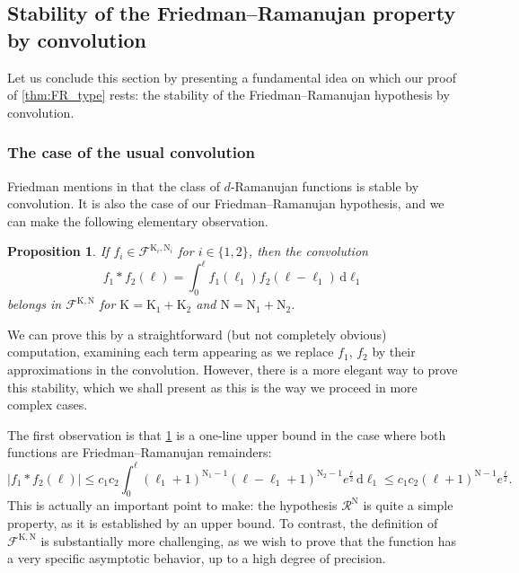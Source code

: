 \documentclass[12pt,twoside]{article}
\theoremstyle{theorem}
\newtheorem{prp}[thm]{Proposition}
\theoremstyle{remark}
\theoremstyle{definition}
\theoremstyle{example}
\renewcommand{\d}{\, \mathrm{d}}
\newcommand{\1}[1]{\mathds{1}_{#1}}
\newcommand{\cR}{\mathcal{R}}
\newcommand{\cF}{\mathcal{F}}
\newcommand{\rK}{\mathrm{K}}
\newcommand{\rN}{\mathrm{N}}
\begin{document}
\subsection{Stability of the Friedman--Ramanujan property by convolution}
\label{sec:stab-friedm-raman}


Let us conclude this section by presenting a fundamental idea on which our proof of
\cref{thm:FR_type} rests: the stability of the Friedman--Ramanujan hypothesis by convolution.


\subsubsection{The case of the usual convolution}
\label{sec:case-usual-conv}

Friedman mentions in \cite{friedman2003} that the class of $d$-Ramanujan functions is stable by
convolution. It is also the case of our Friedman--Ramanujan hypothesis, and we can make the
following elementary observation.

\begin{prp}
  \label{prp:stab_conv}
  If $f_i \in \cF^{\rK_i,\rN_i}$ for $i \in \{1,2\}$, then the convolution
  \begin{equation*}
    f_1 * f_2(\ell) = \int_0^\ell f_1(\ell_1) f_2(\ell-\ell_1) \d \ell_1
  \end{equation*}
  belongs in $\cF^{\rK,\rN}$ for $\rK=\rK_1+\rK_2$ and $\rN=\rN_1+\rN_2$.
\end{prp}

We can prove this by a straightforward (but not completely obvious) computation, examining each term
appearing as we replace $f_1$, $f_2$ by their approximations in the convolution. However, there is a
more elegant way to prove this stability, which we shall present as this is the way we proceed in
more complex cases.

The first observation is that \cref{prp:stab_conv} is a one-line upper bound in the case where both
functions are Friedman--Ramanujan remainders:
\begin{equation*}
  |f_1 * f_2(\ell)|
  \leq c_1 c_2  \int_0^\ell (\ell_1+1)^{\rN_1-1} (\ell-\ell_1+1)^{\rN_2-1} e^{\frac {\ell} 2} \d \ell_1
  \leq c_1c_2 (\ell+1)^{\rN-1} e^{\frac \ell 2}.
\end{equation*}
This is actually an important point to make: the hypothesis $\cR^{\rN}$ is quite a simple property,
as it is established by an upper bound. To contrast, the definition of $\cF^{\rK,\rN}$ is
substantially more challenging, as we wish to prove that the function has a very specific asymptotic
behavior, up to a high degree of precision.
\end{document}
